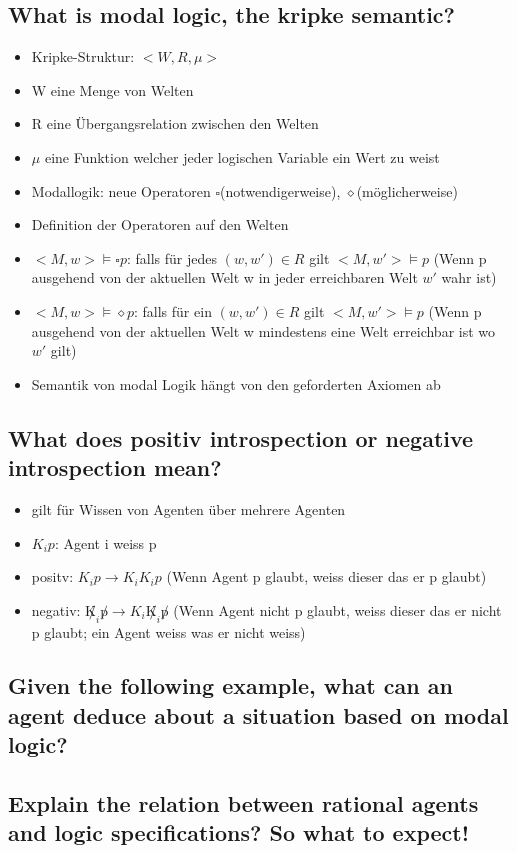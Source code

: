 \subsection{What is modal logic, the kripke semantic?}
\begin{itemize}
	\item Kripke-Struktur: $<W,R,\mu>$
	\item W eine Menge von Welten
	\item R eine Übergangsrelation zwischen den Welten
	\item $\mu$ eine Funktion welcher jeder logischen Variable ein Wert zu weist
	\item Modallogik: neue Operatoren $\square$(notwendigerweise), $\diamond$(möglicherweise)
	\item Definition der Operatoren auf den Welten
	\item $<M,w>\vDash\square p$: falls für jedes $(w,w') \in R$ gilt $<M,w'> \vDash p$ (Wenn p ausgehend von der aktuellen Welt w  in jeder erreichbaren Welt $w'$ wahr ist)
	\item $<M,w>\vDash\diamond p$: falls für ein $(w,w') \in R$ gilt $<M,w'> \vDash p$ (Wenn p ausgehend von der aktuellen Welt w mindestens eine Welt erreichbar ist wo $w'$ gilt)
	\item Semantik von modal Logik hängt von den geforderten Axiomen ab
	\end{itemize}
\subsection{What does positiv introspection or negative introspection mean?}
\begin{itemize}
	\item gilt für Wissen von Agenten über mehrere Agenten
	\item $K_i p$: Agent i weiss p
	\item positv: $K_i p \rightarrow K_i K_i p$ (Wenn Agent p glaubt, weiss dieser das er p glaubt)
	\item negativ: $\not K_i \not p \rightarrow K_i \not K_i \not p$ (Wenn Agent nicht p glaubt, weiss dieser das er  nicht p glaubt; ein Agent weiss was er nicht weiss)
\end{itemize}
\subsection{Given the following example, what can an agent deduce about a situation based on modal logic?}
\subsection{Explain the relation between rational agents and logic specifications? So what to expect!}
